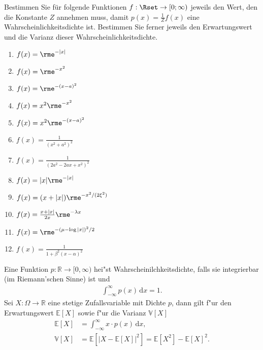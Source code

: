 \documentclass[11pt,answers]{exam}
\begin{document}
\begin{questions}


% 


Bestimmen Sie für folgende Funktionen $f:\Rset\to[0;\infty)$ jeweils
den Wert, den die Konstante $Z$ annehmen muss, damit
$p(x)=\frac{1}{Z}f(x)$ eine Wahrscheinlichkeitsdichte ist.
Bestimmen Sie ferner jeweils den Erwartungswert und die Varianz dieser
Wahrscheinlichkeitsdichte.\\
\parbox{0.5\textwidth}{\begin{enumerate}
\item $f(x)=\rme^{-|x|}$
\item $f(x)=\rme^{-x^2}$
\item $f(x)=\rme^{-(x-a)^2}$
\item $f(x)=x^2\rme^{-x^2}$
\item $f(x)=x^2\rme^{-(x-a)^2}$
\item $f(x)=\frac{1}{\left(x^2+a^2\right)^2}$
\end{enumerate}}\parbox{0.5\textwidth}{\begin{enumerate}\setcounter{enumi}{6}
\item $f(x)=\frac{1}{\left(2 a^2-2 a x+x^2\right)^2}$
\item $f(x)=|x|\rme^{-|x|}$
\item $f(x)=(x+|x|)\rme^{-x^2/(2\xi^2)}$
\item $f(x)=\frac{x+|x|}{2x}\rme^{-\lambda x}$
\item $f(x)=\rme^{-(\mu-\log |x|)^2/2}$
\item $f(x)=\frac{1}{1+\beta^2(x-\alpha)^2}$
\end{enumerate}}
\begin{solution}Eine Funktion $p:\mathbb{R}\to[0,\infty)$ hei"st Wahrscheinilchkeitsdichte, falls sie integrierbar (im Riemann'schen Sinne) ist und 
\begin{align*}
\int_{-\infty}^{\infty}p(x)\,\mathrm dx=1.
\end{align*}
Sei $X:\Omega\to\mathbb{R}$ eine 
stetige Zufallsvariable mit Dichte $p$, dann gilt f"ur den 
Erwartungswert $\mathbb{E}[X]$ sowie f"ur die Varianz $\mathbb{V}[X]$
\begin{align*}
\mathbb{E}[X]&=\int_{-\infty}^{\infty}x\cdot p(x)\,\mathrm dx,
\\
\mathbb{V}[X]&=\mathbb{E}[|X-\mathbb{E}[X]|^2]=\mathbb{E}[X^2]-\mathbb{E}[X]^2.

\end{align*}
\end{solution}
\end{questions}
\end{document}
